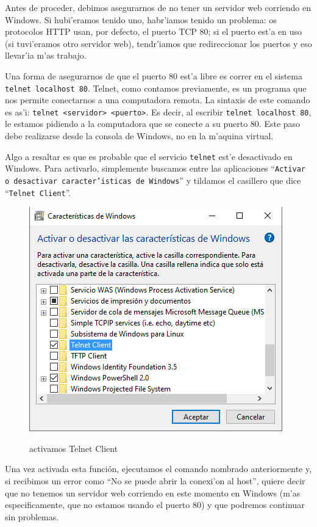 \documentclass[11pt]{article}
\begin{document}
		Antes de proceder, debimos asegurarnos de no tener un servidor web corriendo en Windows. Si hubi'eramos tenido uno, habr'iamos tenido un problema: os protocolos HTTP usan, por defecto, el puerto TCP 80; si el puerto est'a en uso (si tuvi'eramos otro servidor web), tendr'iamos que redireccionar los puertos y eso llevar'ia m'as trabajo.

		Una forma de asegurarnos de que el puerto 80 est'a libre es correr en el sistema \texttt{telnet localhost 80}. Telnet, como contamos previamente, es un programa que nos permite conectarnos a una computadora remota. La sintaxis de este comando es as'i: \texttt{telnet <servidor>{} <puerto>}. Es decir, al escribir \texttt{telnet localhost 80}, le estamos pidiendo a la computadora que se conecte a su puerto 80. Este paso debe realizarse desde la consola de Windows, no en la m'aquina virtual.

		Algo a resaltar es que es probable que el servicio \texttt{telnet} est'e desactivado en Windows. Para activarlo, simplemente buscamos entre las aplicaciones ``\texttt{Activar o desactivar caracter'isticas de Windows}'' y tildamos el casillero que dice ``\texttt{Telnet Client}''. 

		\begin{figure}[H]
  			\centering
    			\includegraphics[scale=0.65]{Images/Apache/fig3.png}
    			\label{fig:3}
    			\caption{activamos Telnet Client}
		\end{figure}

		Una vez activada esta función, ejecutamos el comando nombrado anteriormente y, si recibimos un error como ``No se puede abrir la conexi'on al host'', quiere decir que no tenemos un servidor web corriendo en este momento en Windows (m'as especificamente, que no estamos usando el puerto 80) y que podremos continuar sin problemas.
\end{document}
